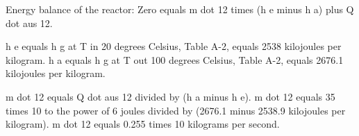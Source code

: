 Energy balance of the reactor:  
Zero equals m dot 12 times (h e minus h a) plus Q dot aus 12.  

h e equals h g at T in 20 degrees Celsius, Table A-2, equals 2538 kilojoules per kilogram.  
h a equals h g at T out 100 degrees Celsius, Table A-2, equals 2676.1 kilojoules per kilogram.  

m dot 12 equals Q dot aus 12 divided by (h a minus h e).  
m dot 12 equals 35 times 10 to the power of 6 joules divided by (2676.1 minus 2538.9 kilojoules per kilogram).  
m dot 12 equals 0.255 times 10 kilograms per second.